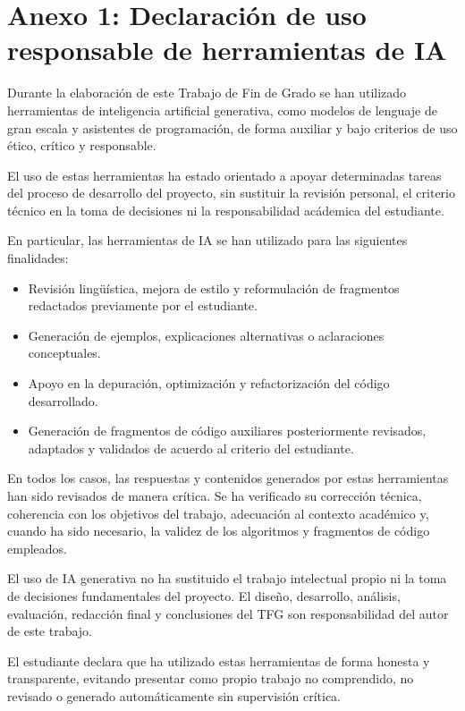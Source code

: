 \chapter*{Anexo 1: Declaración de uso responsable de herramientas de IA}

Durante la elaboración de este Trabajo de Fin de Grado se han utilizado herramientas de inteligencia artificial generativa, como modelos de lenguaje de gran escala
y asistentes de programación, de forma auxiliar y bajo criterios de uso ético, crítico y responsable.

El uso de estas herramientas ha estado orientado a apoyar determinadas tareas del proceso de desarrollo del proyecto, sin sustituir la revisión personal, el criterio
técnico en la toma de decisiones ni la responsabilidad acádemica del estudiante. 

En particular, las herramientas de IA se han utilizado para las siguientes finalidades:

\begin{itemize}
    \item Revisión lingüística, mejora de estilo y reformulación de fragmentos redactados previamente por el estudiante.
    \item Generación de ejemplos, explicaciones alternativas o aclaraciones conceptuales.
    \item Apoyo en la depuración, optimización y refactorización del código desarrollado.
    \item Generación de fragmentos de código auxiliares posteriormente revisados, adaptados y validados de acuerdo al criterio del estudiante.
\end{itemize}

En todos los casos, las respuestas y contenidos generados por estas herramientas han sido revisados de manera crítica. Se ha verificado su corrección técnica, coherencia con los 
objetivos del trabajo, adecuación al contexto académico y, cuando ha sido necesario, la validez de los algoritmos y fragmentos de código empleados.

El uso de IA generativa no ha sustituido el trabajo intelectual propio ni la toma de decisiones fundamentales del proyecto. El diseño, desarrollo, análisis, evaluación, 
redacción final y conclusiones del TFG son responsabilidad del autor de este trabajo.

El estudiante declara que ha utilizado estas herramientas de forma honesta y transparente, evitando presentar como propio trabajo no comprendido, no revisado o generado
automáticamente sin supervisión crítica.

